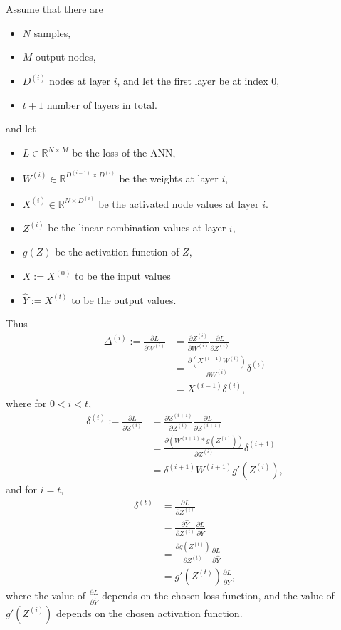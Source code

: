 \documentclass[twocolumn,landscape,10pt]{article}
\theoremstyle{definition}
\begin{document}
Assume that there are
\begin{itemize}
    \item $N$ samples,
    \item $M$ output nodes,
    \item $D^{(i)}$ nodes at layer $i$, and let the first layer be at index 0,
    \item $t + 1$ number of layers in total.
\end{itemize} 
and let
\begin{itemize}
    \item $L\in\mathbb{R}^{N\times M}$ be the loss of the ANN,
    \item $W^{(i)}\in\mathbb{R}^{D^{(i - 1)}\times D^{(i)}}$ be the weights at layer $i$,
    \item $X^{(i)}\in\mathbb{R}^{N\times D^{(i)}}$
        be the activated node values at layer $i$.
    \item $Z^{(i)}$ be the linear-combination values at layer $i$,
    \item $g(Z)$ be the activation function of $Z$,
    \item $X:=X^{(0)}$ to be the input values
    \item $\hat{Y}:=X^{(t)}$ to be the output values.
\end{itemize} 
Thus
\begin{align*}
    \Delta^{(i)}:=\frac{\partial L}{\partial W^{(i)}}
    & = \frac{\partial Z^{(i)}}{\partial W^{(i)}}\frac{\partial L}{\partial Z^{(i)}}\\
    & = \frac{\partial \left(X^{(i-1)}W^{(i)}\right)}{\partial W^{(i)}}\delta^{(i)}\\
    & = X^{(i-1)}\delta^{(i)},
\end{align*} 
where for $0 < i < t$,
\begin{align*}
    \delta^{(i)}:=\frac{\partial L}{\partial Z^{(i)}}
    & = \frac{\partial Z^{(i+1)}}{\partial Z^{(i)}}
    \frac{\partial L}{\partial Z^{(i + 1)}} \\
    & = \frac{\partial \left(W^{(i+1)}*g(Z^{(i)})\right)}{\partial
    Z^{(i)}}\delta^{(i+1)}\\
    & = \delta^{(i+1)}W^{(i+1)}g'(Z^{(i)}),
\end{align*} 
and for $i = t$,
\begin{align*}
    \delta^{(t)}
    & = \frac{\partial L}{\partial Z^{(t)}} \\
    & = \frac{\partial \hat{Y}}{\partial Z^{(t)}}
    \frac{\partial L}{\partial \hat{Y}}\\
    & = \frac{\partial g(Z^{(t)})}{\partial Z^{(t)}}
    \frac{\partial L}{\partial \hat{Y}}\\
    & = g'(Z^{(t)}) \frac{\partial L}{\partial \hat{Y}},
\end{align*} 
where the value of $\frac{\partial L}{\partial \hat{Y}}$ depends on the chosen
loss function, and the value of $g'(Z^{(i)})$ depends on the chosen activation
function.
\end{document}
